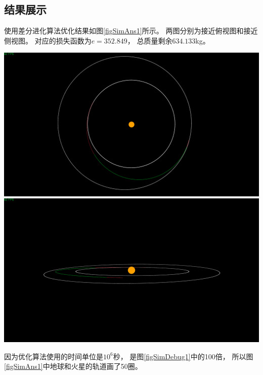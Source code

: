 \subsection{结果展示}
使用差分进化算法优化结果如图\ref{figSimAns1}所示。
两图分别为接近俯视图和接近侧视图。
对应的损失函数为$e=352.849$，
总质量剩余$634.133$kg。
\begin{center}
	\includegraphics[scale=0.2]{simans1.png}  \\
	\includegraphics[scale=0.2]{simans2.png}  \\
	\label{figSimAns1}
\end{center}
因为优化算法使用的时间单位是$10^6$秒，
是图\ref{figSimDebug1}中的100倍，
所以图\ref{figSimAns1}中地球和火星的轨道画了50圈。

